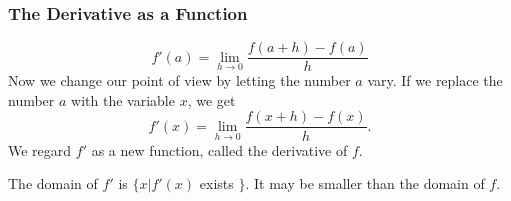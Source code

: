 \begin{frame}
\frametitle{The Derivative as a Function}
\[
f'(a) = \lim_{h\rightarrow 0}\frac{f(a+h)-f(a)}{h}
\]
Now we change our point of view by letting the number $a$ vary.  If we replace the number $a$ with the variable $x$, we get
\[
f'(x) = \lim_{h\rightarrow 0}\frac{f(x+h)-f(x)}{h}.
\]
We regard $f'$ as a new function, called the derivative of $f$.

The domain of $f'$ is $\{ x | f'(x)$ exists $\}$.  It may be smaller than the domain of $f$.
\end{frame}
